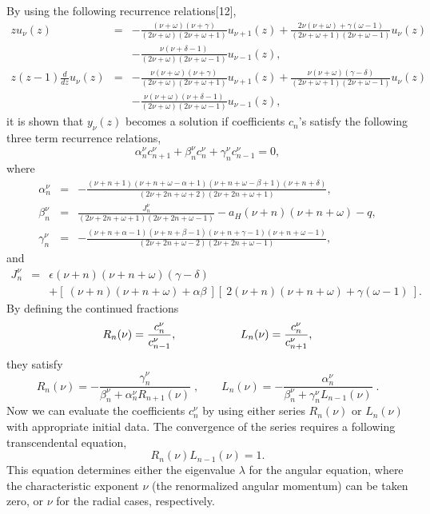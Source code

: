 By using the following recurrence relations[12],
%
\begin{eqnarray}
z u_\nu(z) &=& -\frac{(\nu+\omega)(\nu+\gamma)}
{(2\nu+\omega)(2\nu+\omega+1)} u_{\nu+1}(z)
+\frac{2\nu(\nu+\omega)+\gamma(\omega-1)}
{(2\nu+\omega+1)(2\nu+\omega-1)} u_\nu(z) \nonumber \\
& & -\frac{\nu(\nu+\delta-1)}
{(2\nu+\omega)(2\nu+\omega-1)} u_{\nu-1}(z), \\
z(z-1)\frac{d}{dz} u_\nu(z) &=&  -\frac{\nu(\nu+\omega)(\nu+\gamma)}
{(2\nu+\omega)(2\nu+\omega+1)} u_{\nu+1}(z)
+\frac{\nu(\nu+\omega)(\gamma-\delta)}
{(2\nu+\omega+1)(2\nu+\omega-1)} u_\nu(z) \nonumber \\
& & -\frac{\nu(\nu+\omega)(\nu+\delta-1)}
{(2\nu+\omega)(2\nu+\omega-1)} u_{\nu-1}(z),
\end{eqnarray}
%
it is shown that $y_\nu(z)$ becomes a solution if 
coefficients $c_n$'s satisfy 
the following three term recurrence relations,
%
\begin{equation}
\alpha^\nu_n c^\nu_{n+1} + \beta^\nu_n c^\nu_n + \gamma^\nu_n c^\nu_{n-1}=0,
\label{eqn:rec}
\end{equation}
%
where
%
\begin{eqnarray}
\alpha^\nu_n &=& -\frac{(\nu+n+1)(\nu+n+\omega-\alpha+1)
(\nu+n+\omega-\beta+1)(\nu+n+\delta)}
{(2\nu+2n+\omega+2)(2\nu+2n+\omega+1)}, \label{eqn:alp} \\
\beta^\nu_n &=& 
\frac{J^\nu_n}{(2\nu+2n+\omega+1)(2\nu+2n+\omega-1)} 
- a_H(\nu+n)(\nu+n+\omega)-q, \\
\gamma^\nu_n &=& -\frac{(\nu+n+\alpha-1)(\nu+n+\beta-1)
(\nu+n+\gamma-1)(\nu+n+\omega-1)}
{(2\nu+2n+\omega-2)(2\nu+2n+\omega-1)},  \label{eqn:gam}
\end{eqnarray}
%
and
\begin{eqnarray}
J^\nu_n &=& \epsilon(\nu+n)(\nu+n+\omega)(\gamma-\delta) \nonumber \\
        & &   +[ \ (\nu+n)(\nu+n+\omega)+\alpha\beta \ ]
                [ \ 2(\nu+n)(\nu+n+\omega)+\gamma(\omega-1) \ ].
\end{eqnarray}
By defining the continued fractions
%
\begin{equation}
R_n(\nu)=\frac{c^\nu_n}{c^\nu_{n-1}}, \makebox[2cm]{}
L_n(\nu)=\frac{c^\nu_n}{c^\nu_{n+1}},
\end{equation}
%
they satisfy
%
\begin{equation}
R_n(\nu)=-\frac{\gamma^\nu_n}{\beta^\nu_n+\alpha^\nu_n R_{n+1}(\nu)}
 \;, \qquad
L_n(\nu) = -\frac{\alpha^\nu_n}{\beta^\nu_n+\gamma^\nu_n L_{n-1}(\nu)}
\;.
\end{equation}
%
Now we can evaluate the coefficients $c_n^{\nu}$ by using either 
series $R_n(\nu)$ or $L_n(\nu)$ with appropriate initial data. 
The convergence of the series requires a following 
transcendental equation,
%
\begin{equation}
R_n(\nu) L_{n-1}(\nu) = 1. \label{eqn:aug}
\end{equation}
%
This equation determines either the eigenvalue $\lambda$ for the angular 
equation, where the characteristic exponent $\nu$ (the renormalized angular 
momentum) can be taken zero, or $\nu$ for the radial cases, respectively. 

